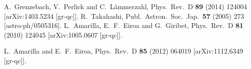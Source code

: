 \documentclass[12pt]{article}
\begin{document}
\begin{small}
\begin{thebibliography}{99}
  A.~Grenzebach, V.~Perlick and C.~L\"ammerzahl,
  Phys.\ Rev.\ D {\bf 89} (2014) 124004 
  [arXiv:1403.5234 [gr-qc]].
  R.~Takahashi,
  Publ.\ Astron.\ Soc.\ Jap.\  {\bf 57} (2005) 273
  [astro-ph/0505316].
  L.~Amarilla, E.~F.~Eiroa and G.~Giribet,
  Phys.\ Rev.\ D {\bf 81} (2010) 124045
  [arXiv:1005.0607 [gr-qc]].

  L.~Amarilla and E.~F.~Eiroa,
  Phys.\ Rev.\ D {\bf 85} (2012) 064019
  [arXiv:1112.6349 [gr-qc]].



\end{thebibliography}
\end{small}
\end{document}
